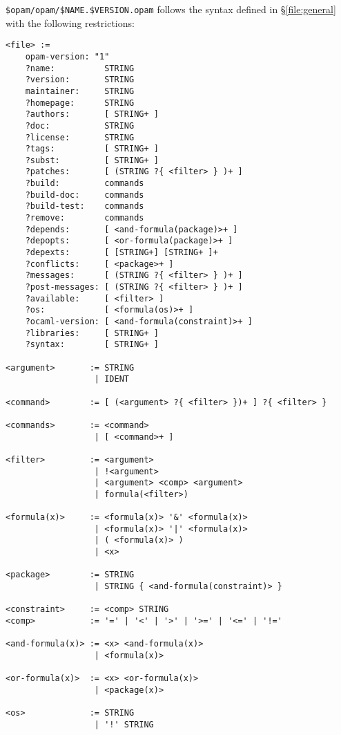 \documentclass[a4paper,11pt]{article}
\begin{document}
\verb+$opam/opam/$NAME.$VERSION.opam+ follows the syntax defined in
\S\ref{file:general} with the following restrictions:

{\small
\begin{Verbatim}[frame=single]
<file> :=
    opam-version: "1"
    ?name:          STRING
    ?version:       STRING
    maintainer:     STRING
    ?homepage:      STRING
    ?authors:       [ STRING+ ]
    ?doc:           STRING
    ?license:       STRING
    ?tags:          [ STRING+ ]
    ?subst:         [ STRING+ ]
    ?patches:       [ (STRING ?{ <filter> } )+ ]
    ?build:         commands
    ?build-doc:     commands
    ?build-test:    commands
    ?remove:        commands
    ?depends:       [ <and-formula(package)>+ ]
    ?depopts:       [ <or-formula(package)>+ ]
    ?depexts:       [ [STRING+] [STRING+ ]+
    ?conflicts:     [ <package>+ ]
    ?messages:      [ (STRING ?{ <filter> } )+ ]
    ?post-messages: [ (STRING ?{ <filter> } )+ ]
    ?available:     [ <filter> ]
    ?os:            [ <formula(os)>+ ]
    ?ocaml-version: [ <and-formula(constraint)>+ ]
    ?libraries:     [ STRING+ ]
    ?syntax:        [ STRING+ ]

<argument>       := STRING
                  | IDENT

<command>        := [ (<argument> ?{ <filter> })+ ] ?{ <filter> }

<commands>       := <command>
                  | [ <command>+ ]

<filter>         := <argument>
                  | !<argument>
                  | <argument> <comp> <argument>
                  | formula(<filter>)

<formula(x)>     := <formula(x)> '&' <formula(x)>
                  | <formula(x)> '|' <formula(x)>
                  | ( <formula(x)> )
                  | <x>

<package>        := STRING
                  | STRING { <and-formula(constraint)> }

<constraint>     := <comp> STRING
<comp>           := '=' | '<' | '>' | '>=' | '<=' | '!='

<and-formula(x)> := <x> <and-formula(x)>
                  | <formula(x)>

<or-formula(x)>  := <x> <or-formula(x)>
                  | <package(x)>

<os>             := STRING
                  | '!' STRING
\end{Verbatim}
}
\end{document}
